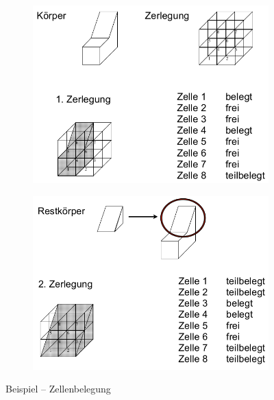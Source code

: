 \begin{figure}[h!]
	\centering
	\begin{subfigure}{.45\textwidth}
		\includegraphics[width=\textwidth]{figures/ch02_zb.png}
	\end{subfigure}
	\begin{subfigure}{.45\textwidth}
		\includegraphics[width=\textwidth]{figures/ch02_zb1.png}
	\end{subfigure}
	\caption{Beispiel -- Zellenbelegung}
	\label{zb}
\end{figure}
\newpage
